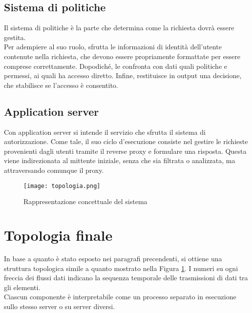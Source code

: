 \subsection{Sistema di politiche}
Il sistema di politiche è la parte che determina come la richiesta dovrà essere gestita. 
\\ Per adempiere al suo ruolo, sfrutta le informazioni di identità dell'utente contenute nella richiesta, che devono essere propriamente formattate per essere comprese correttamente. 
Dopodiché, le confronta con dati quali politiche e permessi, ai quali ha accesso diretto.
Infine, restituisce in output una decisione, che stabilisce se l'accesso è consentito.  

\subsection{Application server} \label{serv_server}
Con application server si intende il servizio che sfrutta il sistema di autorizzazione. Come tale, il suo ciclo d'esecuzione consiste nel gestire 
le richieste provenienti dagli utenti tramite
 il reverse proxy e formulare una risposta.
Questa viene indirezionata al mittente iniziale, senza che sia filtrata o analizzata, ma attraversando comunque il proxy.

\begin{figure}[h]
    \texttt{[image: topologia.png]}
    \centering
    \caption{Rappresentazione concettuale del sistema}
    \label{topologia}
\end{figure}

\section{Topologia finale}
In base a quanto è stato esposto nei paragrafi precendenti, si ottiene una struttura topologica simile a quanto mostrato nella Figura \ref{topologia}. 
I numeri su ogni freccia dei flussi dati indicano la sequenza temporale delle trasmissioni di dati tra gli elementi. 
\\Ciascun componente è interpretabile come un processo separato in esecuzione sullo stesso server o su server diversi. 

